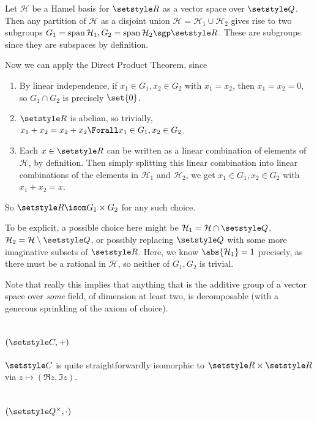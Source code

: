 \documentclass[fleqn,a4paper,11pt]{article}
\begin{document}
Let \(\mathcal H\) be a Hamel basis for \(\Reals\) as a vector space over
\(\Rationals\). Then any partition of \(\mathcal H\) as a disjoint union
\(\mathcal H = \mathcal H_1 \cup \mathcal H_2\) gives rise to two subgroups
\(G_1 = \vspan \mathcal H_1, G_2 = \vspan \mathcal H_2 \sgp \Reals\). These are
subgroups since they are subspaces by definition.

Now we can apply the Direct Product Theorem, since
\begin{enumerate}[label=(\roman*)]
 \item
  By linear independence, if \(x_1 \in G_1, x_2 \in G_2\) with \(x_1 = x_2\),
  then \(x_1 = x_2 = 0\), so \(G_1 \cap G_2\) is precisely \(\set{0}\).
 \item
  \(\Reals\) is abelian, so trivially,
  \(x_1 + x_2 = x_2 + x_2 \Forall x_1 \in G_1, x_2 \in G_2\).
 \item
  Each \(x \in \Reals\) can be written as a linear combination of elements of
  \(\mathcal H\), by definition. Then simply splitting this linear combination
  into linear combinations of the elements in \(\mathcal H_1\) and
  \(\mathcal H_2\), we get \(x_1 \in G_1, x_2 \in G_2\) with \(x_1 + x_2 = x\).
\end{enumerate}
So \(\Reals \isom G_1 \times G_2\) for any such choice.

To be explicit, a possible choice here might be
\(\mathcal H_1 = \mathcal H \cap \Rationals\),
\(\mathcal H_2 = \mathcal H \setminus \Rationals\), or possibly replacing
\(\Rationals\) with some more imaginative subsets of \(\Reals\). Here, we know
\(\abs{\mathcal H_1} = 1\) precisely, as there must be a rational in
\(\mathcal H\), so neither of \(G_1, G_2\) is trivial.

Note that really this implies that anything that is the additive group of a
vector space over \emph{some} field, of dimension at least two, is decomposable
(with a generous sprinkling of the axiom of choice).

\section{\((\Complex, +)\)}

\(\Complex\) is quite straightforwardly isomorphic to \(\Reals \times \Reals\)
via \(z \mapsto (\Re z, \Im z)\).

\section{\((\Rationals^\times, \cdot)\)}
\end{document}
